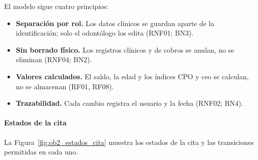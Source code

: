 El modelo sigue cuatro principios:

\begin{itemize}[leftmargin=*]
    \item \textbf{Separación por rol.} Los datos clínicos se guardan aparte de la identificación; solo el odontólogo los edita (RNF01; BN3).
    \item \textbf{Sin borrado físico.} Los registros clínicos y de cobros se anulan, no se eliminan (RNF04; BN2).
    \item \textbf{Valores calculados.} El saldo, la edad y los índices CPO y ceo se calculan, no se almacenan (RF01, RF08).
    \item \textbf{Trazabilidad.} Cada cambio registra el usuario y la fecha (RNF02; BN4).
\end{itemize}

\paragraph{Estados de la cita}

La Figura~\ref{fig:ob2_estados_cita} muestra los estados de la cita y las transiciones permitidas en cada uno.

